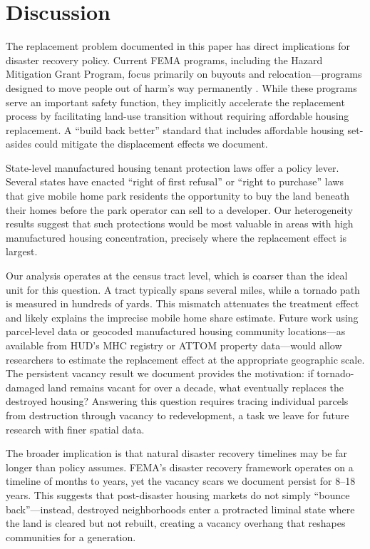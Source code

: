 \documentclass[12pt]{article}
\begin{document}


\section{Discussion}
\label{sec:discussion}

The replacement problem documented in this paper has direct implications for disaster recovery policy. Current FEMA programs, including the Hazard Mitigation Grant Program, focus primarily on buyouts and relocation---programs designed to move people out of harm's way permanently \citep{fema2023hmgp}. While these programs serve an important safety function, they implicitly accelerate the replacement process by facilitating land-use transition without requiring affordable housing replacement. A ``build back better'' standard that includes affordable housing set-asides could mitigate the displacement effects we document.

State-level manufactured housing tenant protection laws offer a policy lever. Several states have enacted ``right of first refusal'' or ``right to purchase'' laws that give mobile home park residents the opportunity to buy the land beneath their homes before the park operator can sell to a developer. Our heterogeneity results suggest that such protections would be most valuable in areas with high manufactured housing concentration, precisely where the replacement effect is largest.

Our analysis operates at the census tract level, which is coarser than the ideal unit for this question. A tract typically spans several miles, while a tornado path is measured in hundreds of yards. This mismatch attenuates the treatment effect and likely explains the imprecise mobile home share estimate. Future work using parcel-level data or geocoded manufactured housing community locations---as available from HUD's MHC registry or ATTOM property data---would allow researchers to estimate the replacement effect at the appropriate geographic scale. The persistent vacancy result we document provides the motivation: if tornado-damaged land remains vacant for over a decade, what eventually replaces the destroyed housing? Answering this question requires tracing individual parcels from destruction through vacancy to redevelopment, a task we leave for future research with finer spatial data.

The broader implication is that natural disaster recovery timelines may be far longer than policy assumes. FEMA's disaster recovery framework operates on a timeline of months to years, yet the vacancy scars we document persist for 8--18 years. This suggests that post-disaster housing markets do not simply ``bounce back''---instead, destroyed neighborhoods enter a protracted liminal state where the land is cleared but not rebuilt, creating a vacancy overhang that reshapes communities for a generation.
\end{document}

